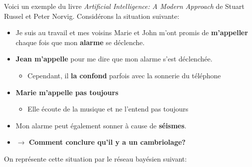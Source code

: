 \begin{example}\leavevmode
    Voici un exemple du livre \textit{Artificial Intelligence: A Modern Approach} de Stuart Russel et Peter Norvig. 
    Considérons la situation suivante: 
    \begin{itemize}
        \item Je suis au travail et mes voisins Marie et John m'ont promis de \textbf{m'appeller} chaque fois que mon \textbf{alarme} se déclenche.
        \item \textbf{Jean m'appelle} pour me dire que mon alarme s'est déclenchée. 
            \begin{itemize}
                \item Cependant, il \textbf{la confond } parfois avec la sonnerie du téléphone
            \end{itemize}
        \item \textbf{Marie m'appelle pas toujours} 
            \begin{itemize}
                \item Elle écoute de la musique et ne l'entend pas toujours
            \end{itemize}
        \item Mon alarme peut également sonner à cause de \textbf{séismes}. 
        \item $\longrightarrow$ \textbf{Comment conclure qu'il y a un cambriolage?}
    \end{itemize}
    On représente cette situation par le réseau bayésien suivant: 
    \begin{figure}[H]
    \centering
\end{figure}
\end{example}
